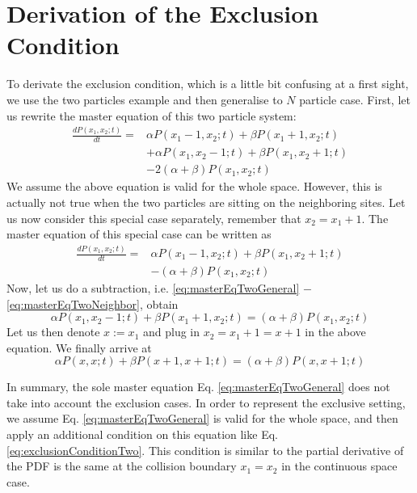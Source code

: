 
\chapter{Derivation of the Exclusion Condition}
To derivate the exclusion condition, which is a little bit confusing at a first sight, we use the two particles example and then generalise to $N$ particle case.
First, let us rewrite the master equation of this two particle system:
\begin{equation}
    \begin{aligned}
        \label{eq:masterEqTwoGeneral}
    \frac{d P(x_1, x_2; t)}{dt} = & \alpha P(x_1-1,x_2;t) + \beta P(x_1+1,x_2;t) \\ 
    & + \alpha P(x_1, x_2-1; t) + \beta P(x_1, x_2+1; t)  \\ 
    & - 2(\alpha+\beta)P(x_1, x_2; t)
    \end{aligned}
\end{equation}
We assume the above equation is valid for the whole space. However, this is actually not true when the two particles are sitting on the neighboring sites. Let us now consider this special case separately, remember that $x_2 = x_1 + 1$. The master equation of this special case can be written as
\begin{equation}
    \begin{aligned}
        \label{eq:masterEqTwoNeighbor}
        \frac{d P(x_1, x_2; t)}{dt} = 
        & \alpha P(x_1-1,x_2;t) + \beta P(x_1, x_2+1; t)  \\ 
    & - (\alpha+\beta)P(x_1, x_2; t)
    \end{aligned}
\end{equation}
Now, let us do a subtraction, i.e. \eqref{eq:masterEqTwoGeneral} $-$ \eqref{eq:masterEqTwoNeighbor}, obtain
\begin{equation}
    \alpha P(x_1, x_2-1; t) + \beta P(x_1 + 1, x_2; t) = (\alpha + \beta)P(x_1, x_2; t)
\end{equation}
Let us then denote $x:=x_1$ and plug in $x_2 = x_1+1 = x+1$ in the above equation. We finally arrive at
\begin{equation}
    \label{eq:exclusionConditionTwo}
    \alpha P(x, x; t) + \beta P(x+1, x+1; t) = (\alpha + \beta)P(x, x+1; t)
\end{equation}

In summary, the sole master equation Eq. \eqref{eq:masterEqTwoGeneral} does not take into account the exclusion cases. In order to represent the exclusive setting, we assume Eq. \eqref{eq:masterEqTwoGeneral} is valid for the whole space, and then apply an additional condition on this equation like Eq. \eqref{eq:exclusionConditionTwo}. This condition is similar to the partial derivative of the PDF is the same at the collision boundary $x_1 = x_2$ in the continuous space case. 

